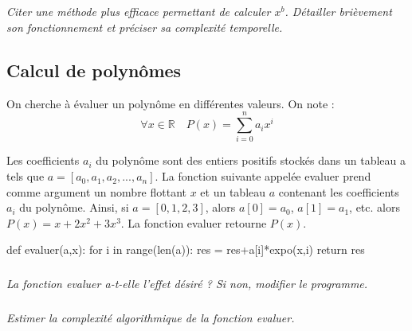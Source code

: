 \documentclass[10pt]{article}
\begin{document}
\subparagraph{}
\textit{Citer une méthode plus efficace permettant de calculer $x^b$. Détailler brièvement son fonctionnement et préciser sa complexité temporelle.}



\subsection*{Calcul de polynômes}
On cherche à évaluer un polynôme en différentes valeurs. On note :
$$
\forall x \in \mathbb{R} \quad P(x) = \sum\limits_{i=0}^n a_i x^i
$$

Les coefficients $a_i$ du polynôme sont des entiers positifs stockés dans un tableau \textsf{a} tels que $a=[a_0,a_1,a_2,...,a_n]$. La fonction suivante appelée \textsf{evaluer} prend comme argument un nombre flottant $x$ et un tableau $a$ contenant les coefficients $a_i$ du polynôme.
Ainsi, si $a=[0,1,2,3]$, alors $a[0]=a_0$, $a[1]=a_1$, etc. alors $P(x)=x+2x^2+3x^3$. La fonction  \textsf{evaluer} retourne $P(x)$.

\begin{py}
\begin{python}
def evaluer(a,x):
    for i in range(len(a)):
        res = res+a[i]*expo(x,i) 
    return res
\end{python}
\end{py}


\subparagraph{}
\textit{La fonction \textsf{evaluer} a-t-elle l'effet désiré ? Si non, modifier le programme.}

\subparagraph{}
\textit{Estimer la complexité algorithmique de la fonction \textsf{evaluer}.}
\end{document}
